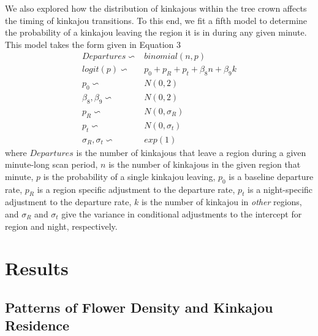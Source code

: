 \documentclass[twoside,12pt,final]{ucthesis-CA2012}
\begin{document}
\begin{ucmainmatter}
We also explored how the distribution of kinkajous within the tree crown affects the timing of kinkajou transitions. To this end, we fit a fifth model to determine the probability of a kinkajou leaving the region it is in during any given minute. This model takes the form given in Equation 3
\begin{align*}
Departures \backsim{}& binomial(n,p) \\
logit(p) \backsim{}& p_0 + p_R + p_t + \beta_8n + \beta_9k \\
p_0 \backsim{}& N(0,2) \\
\beta_8, \beta_9 \backsim{}& N(0,2) \\
p_R \backsim{}& N(0,\sigma_R) \\
p_t \backsim{}& N(0, \sigma_t) \\
\sigma_R, \sigma_t \backsim{}& exp(1)
\end{align*}
where \(Departures\) is the number of kinkajous that leave a region during a given minute-long scan period, \(n\) is the number of kinkajous in the given region that minute, \(p\) is the probability of a single kinkajou leaving, \(p_0\) is a baseline departure rate, \(p_R\) is a region specific adjustment to the departure rate, \(p_t\) is a night-specific adjustment to the departure rate, \(k\) is the number of kinkajou in \emph{other} regions, and \(\sigma_R\) and \(\sigma_t\) give the variance in conditional adjustments to the intercept for region and night, respectively.

\hypertarget{results-1}{%
\section{Results}\label{results-1}}

\hypertarget{patterns-of-flower-density-and-kinkajou-residence}{%
\subsection{Patterns of Flower Density and Kinkajou Residence}\label{patterns-of-flower-density-and-kinkajou-residence}}


\end{ucmainmatter}
\end{document}
